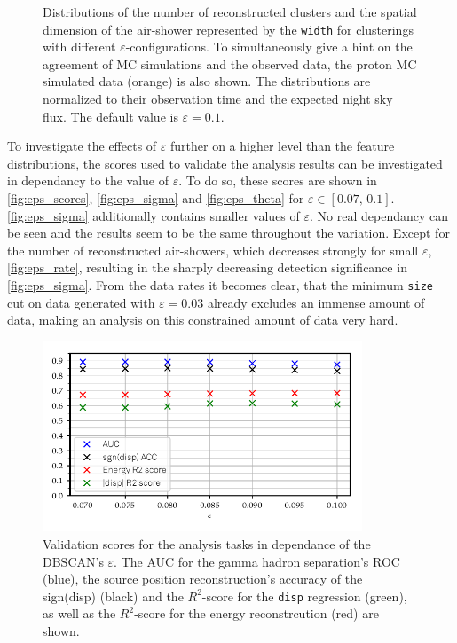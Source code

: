 \begin{figure}
\begin{subfigure}{0.5\textwidth}
  \end{subfigure}
  \caption{Distributions of the number of reconstructed
  clusters and the spatial dimension of the air-shower represented by the
  \texttt{width} for clusterings with different $\varepsilon$-configurations. To simultaneously give a hint on the agreement of MC simulations and the observed data, the proton MC simulated data (orange) is also shown. The distributions are normalized to their observation time and the expected night sky flux. The default value is $\varepsilon = 0.1$.}
  \label{fig:eps_feat3}
\end{figure}
%
To investigate the effects of $\varepsilon$ further on a higher level than the
feature distributions, the scores used to validate the analysis results can be
investigated in dependancy to the value of $\varepsilon$. To do so, these
scores are shown in \autoref{fig:eps_scores}, \ref{fig:eps_sigma} and
\ref{fig:eps_theta} for $\varepsilon \in [0.07,\,0.1]$. \autoref{fig:eps_sigma}
additionally contains smaller values of $\varepsilon$. No real dependancy can
be seen and the results seem to be the same throughout the variation. Except
for the number of reconstructed air-showers, which decreases strongly for small
$\varepsilon$, \autoref{fig:eps_rate}, resulting in the sharply decreasing
detection significance in \autoref{fig:eps_sigma}. From the data rates it becomes clear, that the minimum \texttt{size} cut on data generated with $\varepsilon=0.03$ already excludes an immense amount of data, making an analysis on this constrained amount of data very hard.
%
\begin{figure}
  \centering
  \includegraphics[width=0.85\textwidth]{Plots/Epsilon/eps_scores.pdf}
  \caption{Validation scores for the analysis tasks in dependance of the DBSCAN's $\varepsilon$. The AUC for the gamma hadron separation's ROC (blue), the source position reconstruction's accuracy of the sign(disp) (black) and the $R^2$-score for the \texttt{disp} regression (green), as well as the $R^2$-score for the energy reconstrcution (red) are shown.}
  \label{fig:eps_scores}
\end{figure}
